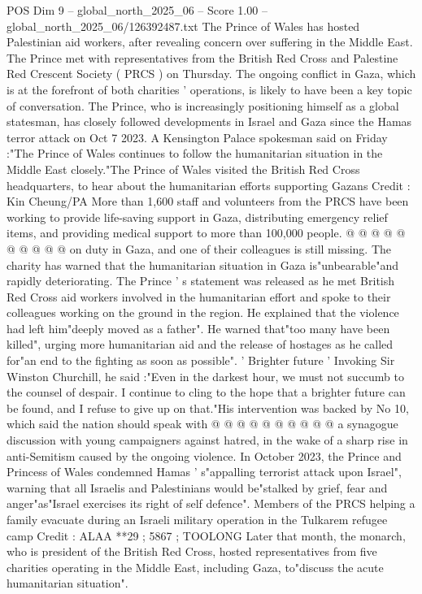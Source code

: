 \begin{textsample}{POS Dim 9 – global\_north\_2025\_06 – Score 1.00 – global\_north\_2025\_06/126392487.txt}  \label{ex:f9_pos_372}
The Prince of Wales has hosted Palestinian aid workers, after revealing concern over suffering in the Middle East.
The Prince met with representatives from the British Red Cross and Palestine Red Crescent Society ( PRCS ) on Thursday.
The ongoing conflict in Gaza, which is at the forefront of both charities ' operations, is likely to have been a key topic of conversation.
The Prince, who is increasingly positioning himself as a global statesman, has closely followed developments in Israel and Gaza since the Hamas terror attack on Oct 7 2023.
A Kensington Palace spokesman said on Friday :"The Prince of Wales continues to follow the humanitarian situation in the Middle East closely."The Prince of Wales visited the British Red Cross headquarters, to hear about the humanitarian efforts supporting Gazans Credit : Kin Cheung/PA More than 1,600 staff and volunteers from the PRCS have been working to provide life-saving support in Gaza, distributing emergency relief items, and providing medical support to more than 100,000 people. @ @ @ @ @ @ @ @ @ @ on duty in Gaza, and one of their colleagues is still missing.
The charity has warned that the humanitarian situation in Gaza is"unbearable"and rapidly deteriorating.
The Prince ' s statement was released as he met British Red Cross aid workers involved in the humanitarian effort and spoke to their colleagues working on the ground in the region.
He explained that the violence had left him"deeply moved as a father".
He warned that"too many have been killed", urging more humanitarian aid and the release of hostages as he called for"an end to the fighting as soon as possible". ' Brighter future ' Invoking Sir Winston Churchill, he said :"Even in the darkest hour, we must not succumb to the counsel of despair.
I continue to cling to the hope that a brighter future can be found, and I refuse to give up on that."His intervention was backed by No 10, which said the nation should speak with @ @ @ @ @ @ @ @ @ @ a synagogue discussion with young campaigners against hatred, in the wake of a sharp rise in anti-Semitism caused by the ongoing violence.
In October 2023, the Prince and Princess of Wales condemned Hamas ' s"appalling terrorist attack upon Israel", warning that all Israelis and Palestinians would be"stalked by grief, fear and anger"as"Israel exercises its right of self defence".
Members of the PRCS helping a family evacuate during an Israeli military operation in the Tulkarem refugee camp Credit : ALAA **29 ; 5867 ; TOOLONG Later that month, the monarch, who is president of the British Red Cross, hosted representatives from five charities operating in the Middle East, including Gaza, to"discuss the acute humanitarian situation".

\end{textsample}
